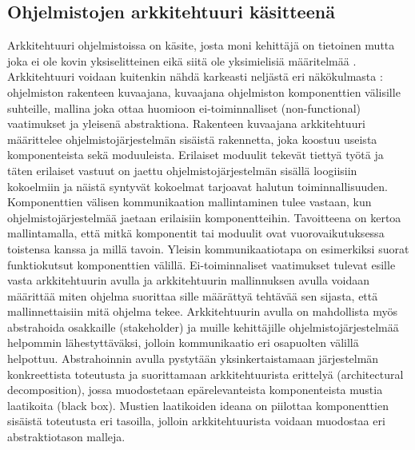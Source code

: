 \documentclass[finnish]{tktltiki2}
\theoremstyle{definition}
\theoremstyle{remark}
\begin{document}
\subsection{Ohjelmistojen arkkitehtuuri käsitteenä}
Arkkitehtuuri ohjelmistoissa on käsite, josta moni kehittäjä on tietoinen mutta joka ei ole kovin yksiselitteinen eikä siitä ole yksimielisiä määritelmää \cite[s. 363]{solms_what_2012}. Arkkitehtuuri voidaan kuitenkin nähdä karkeasti neljästä eri näkökulmasta  \citep[s. 2-7]{gorton_understanding_2011}:  ohjelmiston rakenteen kuvaajana, kuvaajana ohjelmiston komponenttien välisille suhteille, mallina joka ottaa huomioon ei-toiminnalliset (non-functional) vaatimukset ja yleisenä abstraktiona. 
Rakenteen kuvaajana arkkitehtuuri määrittelee ohjelmistojärjestelmän sisäistä rakennetta, joka koostuu useista komponenteista sekä moduuleista. Erilaiset moduulit tekevät tiettyä työtä ja täten erilaiset vastuut on jaettu ohjelmistojärjestelmän sisällä loogiisiin kokoelmiin ja näistä syntyvät kokoelmat tarjoavat halutun toiminnallisuuden.
Komponenttien välisen kommunikaation mallintaminen tulee vastaan, kun ohjelmistojärjestelmää jaetaan erilaisiin komponentteihin. Tavoitteena on kertoa mallintamalla, että mitkä komponentit tai moduulit ovat vuorovaikutuksessa toistensa kanssa ja millä tavoin. Yleisin kommunikaatiotapa on esimerkiksi suorat funktiokutsut komponenttien välillä.  
Ei-toiminnaliset vaatimukset tulevat esille vasta arkkitehtuurin avulla ja arkkitehtuurin mallinnuksen avulla voidaan määrittää miten ohjelma suorittaa sille määrättyä tehtävää sen sijasta, että mallinnettaisiin mitä ohjelma tekee. 
Arkkitehtuurin avulla on mahdollista myös abstrahoida %
osakkaille (stakeholder) ja muille kehittäjille ohjelmistojärjestelmää helpommin lähestyttäväksi, jolloin kommunikaatio eri osapuolten välillä helpottuu. Abstrahoinnin avulla pystytään yksinkertaistamaan järjestelmän konkreettista toteutusta ja suorittamaan arkkitehtuurista erittelyä (architectural decomposition), jossa muodostetaan epärelevanteista komponenteista mustia laatikoita (black box). Mustien laatikoiden ideana on piilottaa komponenttien sisäistä toteutusta eri tasoilla, jolloin arkkitehtuurista voidaan muodostaa eri abstraktiotason malleja.
\end{document}

